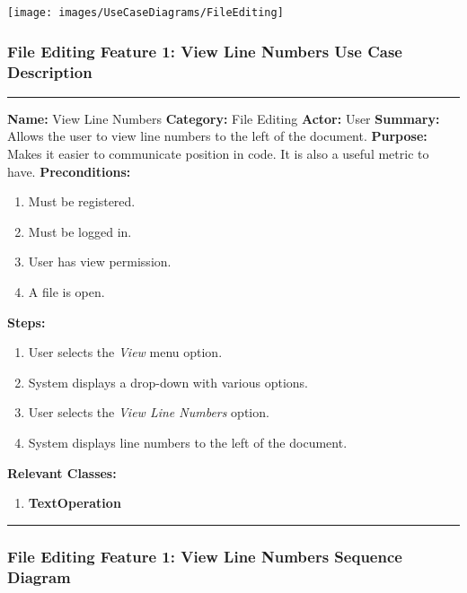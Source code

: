 \documentclass[twoside,letterpaper]{article}
\begin{document}
\texttt{[image: images/UseCaseDiagrams/FileEditing]}

\newpage

\subsubsection[File Editing Feature 1: View Line Numbers]{\rmfamily\bfseries\color{black}
	File Editing Feature 1: View Line Numbers Use Case Description}
\hypertarget{RefHeading22059017292}{}

\vspace{2pt}
\hrule
\vspace{8pt}
	\noindent\textbf{Name:} View Line Numbers \newline
	\noindent\textbf{Category:} File Editing \newline
	\noindent\textbf{Actor:} User \newline
	\noindent\textbf{Summary:} Allows the user to view line numbers to the left of the document. \newline
	\noindent\textbf{Purpose:} Makes it easier to communicate position in code. It is also a useful metric to have.\newline
	\noindent\textbf{Preconditions:}
	\begin{enumerate}
		\item Must be registered.
		\item Must be logged in.
		\item User has view permission.
		\item A file is open.
	\end{enumerate}
	\noindent\textbf{Steps:}
	\begin{enumerate}
		\item User selects the \textit{View} menu option.
		\item System displays a drop-down with various options.
		\item User selects the \textit{View Line Numbers} option.
		\item System displays line numbers to the left of the document.
	\end{enumerate}
	\noindent\textbf{Relevant Classes:}
	\begin{enumerate}
		\item \textbf {TextOperation}

	\end{enumerate}
\vspace{8pt}
\hrule
\newpage

\subsubsection[File Editing Feature 1: View Line Numbers Sequence Diagram]{\rmfamily\bfseries\color{black}
	File Editing Feature 1: View Line Numbers Sequence Diagram}
\hypertarget{RefHeading22059017292}{}
\end{document}
